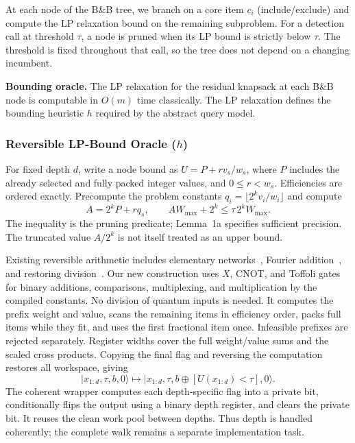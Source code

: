 \documentclass[pdflatex,sn-mathphys-num]{sn-jnl}
\begin{document}
At each node of the B\&B tree, we branch on a core item $c_i$ (include/exclude) and compute the LP relaxation bound on the remaining subproblem. For a detection call at threshold $\tau$, a node is pruned when its LP bound is strictly below $\tau$. The threshold is fixed throughout that call, so the tree does not depend on a changing incumbent.

\textbf{Bounding oracle.} The LP relaxation for the residual knapsack at each B\&B node is computable in $O(m)$ time classically. The LP relaxation defines the bounding heuristic $h$ required by the abstract query model.


\subsubsection{Reversible LP-Bound Oracle ($h$)}

For fixed depth $d$, write a node bound as $U=P+r v_s/w_s$, where $P$ includes the already selected and fully packed integer values, and $0\le r<w_s$. Efficiencies are ordered exactly. Precompute the problem constants $q_i=\lfloor 2^k v_i/w_i\rfloor$ and compute
\begin{equation}
A=2^kP+r q_s,\qquad A W_{\max}+2^k\le \tau\,2^kW_{\max}.
\label{eq:robust-node}
\end{equation}
The inequality is the pruning predicate; Lemma~1a specifies sufficient precision. The truncated value $A/2^k$ is not itself treated as an upper bound.

Existing reversible arithmetic includes elementary networks~\cite{vedral1996}, Fourier addition~\cite{draper2000}, and restoring division~\cite{thapliyal2016}. Our new construction uses $X$, CNOT, and Toffoli gates for binary additions, comparisons, multiplexing, and multiplication by the compiled constants. No division of quantum inputs is needed. It computes the prefix weight and value, scans the remaining items in efficiency order, packs full items while they fit, and uses the first fractional item once. Infeasible prefixes are rejected separately. Register widths cover the full weight/value sums and the scaled cross products. Copying the final flag and reversing the computation restores all workspace, giving
\[
|x_{1:d},\tau,b,0\rangle\longmapsto
|x_{1:d},\tau,b\oplus[U(x_{1:d})<\tau],0\rangle.
\]
The coherent wrapper computes each depth-specific flag into a private bit, conditionally flips the output using a binary depth register, and clears the private bit. It reuses the clean work pool between depths. Thus depth is handled coherently; the complete walk remains a separate implementation task.
\end{document}
